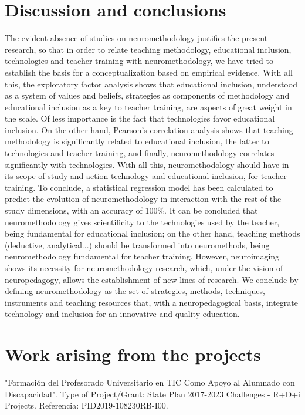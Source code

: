 \documentclass[english]{textolivre}
\begin{document}
\section{Discussion and conclusions}\label{sec-formato}
The evident absence of studies on neuromethodology justifies the present research, so that in order to relate teaching methodology, educational inclusion, technologies and teacher training with neuromethodology, we have tried to establish the basis for a conceptualization based on empirical evidence. With all this, the exploratory factor analysis shows that educational inclusion, understood as a system of values and beliefs, strategies as components of methodology and educational inclusion as a key to teacher training, are aspects of great weight in the scale. Of less importance is the fact that technologies favor educational inclusion. On the other hand, Pearson's correlation analysis shows that teaching methodology is significantly related to educational inclusion, the latter to technologies and teacher training, and finally, neuromethodology correlates significantly with technologies. With all this, neuromethodology should have in its scope of study and action technology and educational inclusion, for teacher training. To conclude, a statistical regression model has been calculated to predict the evolution of neuromethodology in interaction with the rest of the study dimensions, with an accuracy of 100\%. It can be concluded that neuromethodology gives scientificity to the technologies used by the teacher, being fundamental for educational inclusion; on the other hand, teaching methods (deductive, analytical...) should be transformed into neuromethods, being neuromethodology fundamental for teacher training. However, neuroimaging shows its necessity for neuromethodology research, which, under the vision of neuropedagogy, allows the establishment of new lines of research. We conclude by defining neuromethodology as the set of strategies, methods, techniques, instruments and teaching resources that, with a neuropedagogical basis, integrate technology and inclusion for an innovative and quality education.

\section{Work arising from the projects}
"Formación del Profesorado Universitario en TIC Como Apoyo al Alumnado con Discapacidad". Type of Project/Grant: State Plan 2017-2023 Challenges - R+D+i Projects. Referencia: PID2019-108230RB-I00. 
\end{document}
